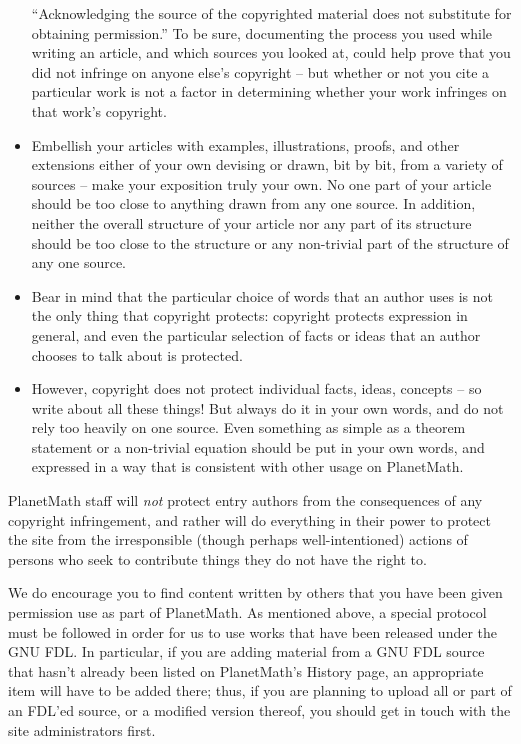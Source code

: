 \begin{itemize}
``Acknowledging the source of the copyrighted material does not
substitute for obtaining permission.'' To be sure, documenting the
process you used while writing an article, and which sources you
looked at, could help prove that you did not infringe on anyone
else's copyright -- but whether or not you cite a particular work is
not a factor in determining whether your work infringes on that
work's copyright.
\item Embellish your articles with examples, illustrations, proofs,
and other extensions either of your own devising or drawn, bit by
bit, from a variety of sources -- make your exposition truly your
own. No one part of your article should be too close to anything
drawn from any one source. In addition, neither the overall
structure of your article nor any part of its structure should be
too close to the structure or any non-trivial part of the structure of
any one source.
\item Bear in mind that the particular choice of words that an author
uses is not the only thing that copyright protects: copyright
protects expression in general, and even the particular selection of
facts or ideas that an author chooses to talk about is protected.
\item However, copyright does not protect individual facts, ideas,
concepts -- so write about all these things! But always do it in
your own words, and do not rely too heavily on one source. Even
something as simple as a theorem statement or a non-trivial equation
should be put in your own words, and expressed in a way that is
consistent with other usage on PlanetMath.
\end{itemize}

PlanetMath staff will \emph{not} protect entry authors from the
consequences of any copyright infringement, and rather will do
everything in their power to protect the site from the irresponsible
(though perhaps well-intentioned) actions of persons who seek to
contribute things they do not have the right to.

We do encourage you to find content written by others that you have
been given permission use as part of PlanetMath. As mentioned above,
a special protocol must be followed in order for us to use works that
have been released under the GNU FDL. In particular, if you are
adding material from a GNU FDL source that hasn't already been listed
on PlanetMath's History page, an appropriate item will have to be
added there; thus, if you are planning to upload all or part of an
FDL'ed source, or a modified version thereof, you should get in touch
with the site administrators first.

